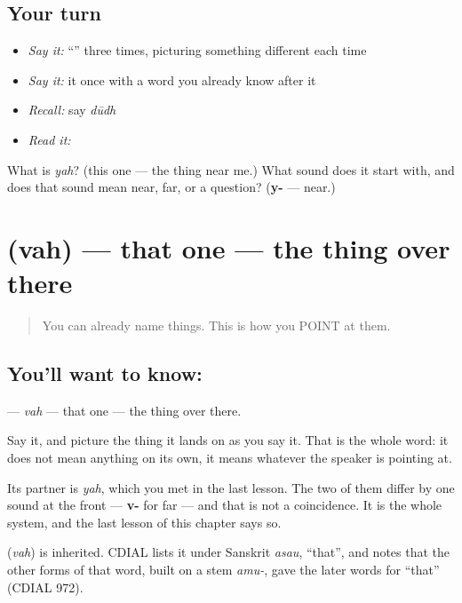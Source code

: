 \subsection*{Your turn}
\begin{itemize}
\raggedright
  \item \emph{Say it:} \textquotedblleft{}\textquotedblright{} three times, picturing something different each time
  \item \emph{Say it:} it once with a word you already know after it
  \item \emph{Recall:} say \emph{dūdh}
  \item \emph{Read it:} \textbf{}
\end{itemize}

\begin{tcolorbox}[breakable,colback=teal!4,colframe=teal!35!black,title={Before you move on}]
What is \emph{yah}? (this one — the thing near me.) What sound does it start with, and does that sound mean near, far, or a question? (\textbf{y-} — near.)
\end{tcolorbox}
\section[\texorpdfstring{\hi{वह} (vah)}{वह (vah)}]{ (vah) — that one — the thing over there}

\label{lesson:HI-C40-that}



\begin{quote}
You can already name things. This is how you POINT at them.
\end{quote}

\subsection*{You'll want to know: }
\textbf{} — \emph{vah} — that one — the thing over there.

Say it, and picture the thing it lands on as you say it. That is the whole word: it does not mean anything on its own, it means whatever the speaker is pointing at.

Its partner is \textbf{} \emph{yah}, which you met in the last lesson. The two of them differ by one sound at the front — \textbf{v-} for far — and that is not a coincidence. It is the whole system, and the last lesson of this chapter says so.

\begin{cousinweb}
\textbf{} (\emph{vah}) is inherited. CDIAL lists it under Sanskrit \emph{asau}, \textquotedblleft{}that\textquotedblright{}, and notes that the other forms of that word, built on a stem \emph{amu-}, gave the later words for \textquotedblleft{}that\textquotedblright{} (CDIAL 972).
\end{cousinweb}

